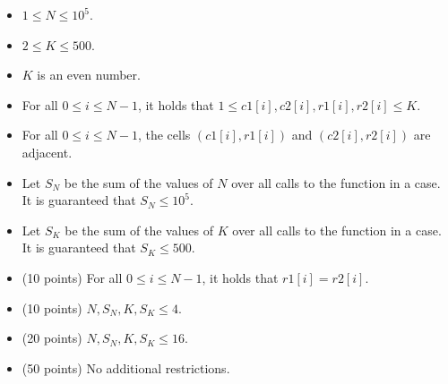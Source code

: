 \documentclass[12pt]{scrartcl}
\begin{document}
        \begin{itemize}
            \item $1 \le N \le 10^5$.
            \item $2 \le K \le 500$. 
            \item $K$ is an even number.
            \item For all $0 \le i \le N - 1$, it holds that $1 \le c1[i], c2[i], r1[i], r2[i] \le K$.
            \item For all $0 \le i \le N - 1$, the cells $(c1[i], r1[i])$ and $(c2[i], r2[i])$ are adjacent.
            \item Let $S_N$ be the sum of the values of $N$ over all calls to the function in a case. It is guaranteed that $S_N \le 10^5$.
            \item Let $S_K$ be the sum of the values of $K$ over all calls to the function in a case. It is guaranteed that $S_K \le 500$.
        \end{itemize}
    


    \begin{itemize}
        \item (10 points) For all $0 \le i \le N - 1$, it holds that $r1[i] = r2[i]$.
        \item (10 points) $N, S_N, K, S_K \le 4$.
        \item (20 points) $N, S_N, K, S_K \le 16$.
        \item (50 points) No additional restrictions.
    \end{itemize}
\end{document}
